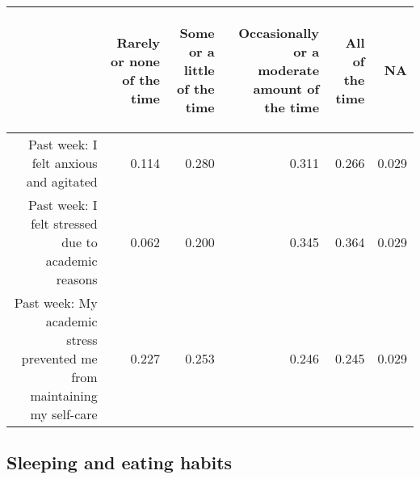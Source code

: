\documentclass{article}\usepackage[]{graphicx}\usepackage[]{color}
\begin{document}
\begin{table}[ht]
\centering
\begin{tabular}{rrrrrr}
  \hline
 & \begin{sideways} Rarely or none of the time \end{sideways} & \begin{sideways} Some or a little of the time \end{sideways} & \begin{sideways} Occasionally or a moderate amount of the time \end{sideways} & \begin{sideways} All of the time \end{sideways} & \begin{sideways} NA \end{sideways} \\ 
  \hline
Past week: I felt anxious and agitated & 0.114 & 0.280 & 0.311 & 0.266 & 0.029 \\ 
  	Past week: I felt stressed due to academic reasons & 0.062 & 0.200 & 0.345 & 0.364 & 0.029 \\ 
  Past week: My academic stress prevented me from maintaining my self-care & 0.227 & 0.253 & 0.246 & 0.245 & 0.029 \\ 
   \hline
\end{tabular}
\end{table}


\subsection{Sleeping and eating habits}
\end{document}
